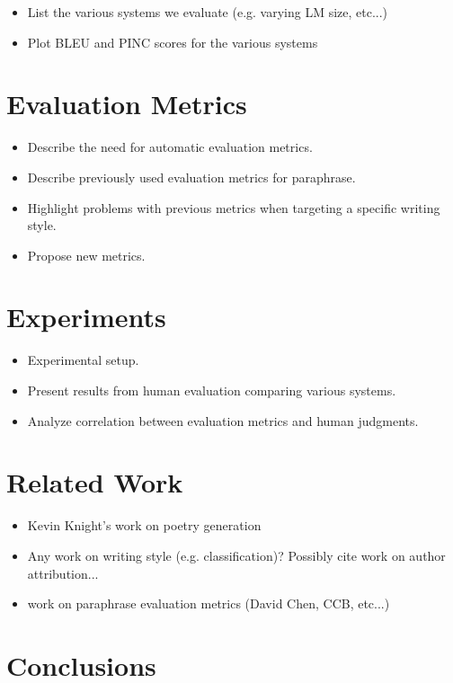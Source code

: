 \documentclass[10pt,a5paper,twoside]{article}
\begin{document}
\begin{itemize}
  \item List the various systems we evaluate (e.g. varying LM size, etc...)
  \item Plot BLEU and PINC scores for the various systems
\end{itemize}

\section{Evaluation Metrics}
\begin{itemize}
  \item Describe the need for automatic evaluation metrics.
  \item Describe previously used evaluation metrics for paraphrase.
  \item Highlight problems with previous metrics when targeting a specific writing style.
  \item Propose new metrics.
\end{itemize}

\section{Experiments}
\begin{itemize}
  \item Experimental setup.
  \item Present results from human evaluation comparing various systems.
  \item Analyze correlation between evaluation metrics and human judgments.
\end{itemize}

\section{Related Work}
\begin{itemize}
  \item Kevin Knight's work on poetry generation
  \item Any work on writing style (e.g. classification)?  Possibly cite work on author attribution...
  \item work on paraphrase evaluation metrics (David Chen, CCB, etc...)
\end{itemize}

\section{Conclusions}





\end{document}
